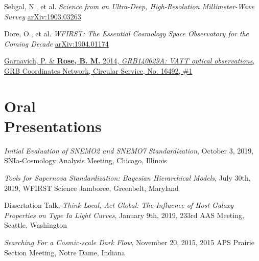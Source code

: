 \documentclass[margin]{res}
\begin{document}
\begin{resume}
\vspace{-12pt}\hspace{15pt}\hangindent=30pt 
Sehgal, N., et al. \textit{Science from an Ultra-Deep, High-Resolution Millimeter-Wave Survey}
\href{https://ui.adsabs.harvard.edu/abs/2019arXiv190303263S/abstract}{arXiv:1903.03263}

\vspace{-12pt}\hspace{15pt}\hangindent=30pt 
Dore, O., et al. \textit{WFIRST: The Essential Cosmology Space Observatory for the Coming Decade}
\href{https://ui.adsabs.harvard.edu/abs/2019arXiv190401174D/abstract}{arXiv:1904.01174}

\vspace{-12pt}
\hangindent=15pt \href{https://ui.adsabs.harvard.edu/abs/2014GCN..16492...1G/abstract}{Garnavich, P. \& {\bf Rose, B. M.} 2014, {\sl GRB140629A: VATT optical observations}, GRB Coordinates Network, Circular Service, No. 16492, \#1}



\section{Oral \\Presentations}


\hangindent=15pt 
{\sl Initial Evaluation of SNEMO2 and SNEMO7 Standardization}, October 3, 2019, SNIa-Cosmology Analysis Meeting, Chicago, Illinois
\vspace{-12pt}

\hangindent=15pt 
{\sl Tools for Supernova Standardization: 
Bayesian Hierarchical Models}, July 30th, 2019,
WFIRST Science Jamboree, Greenbelt, Maryland
\vspace{-12pt}



\hangindent=15pt 
Dissertation Talk. {\sl Think Local, Act Global: The Influence of Host Galaxy Properties on Type Ia Light Curves}, January 9th, 2019,
233rd AAS Meeting, Seattle, Washington
\vspace{-12pt}


\hangindent=15pt 
{\sl Searching For a Cosmic-scale Dark Flow}, November 20, 2015,
2015 APS Prairie Section Meeting, Notre Dame, Indiana
\vspace{-12pt}


\end{resume}
\end{document}
